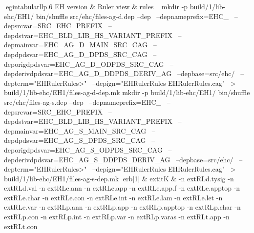 egin{tabular}{llp{.6\linewidth}}
EH version & Ruler view & rules \ \hline
mkdir -p build/1/lib-ehc/EH1/
bin/shuffle src/ehc/files-ag-d.dep --dep \
	  --depnameprefix=EHC_ \
	  --depsrcvar=SRC_EHC_PREFIX \
	  --depdstvar=EHC_BLD_LIB_HS_VARIANT_PREFIX \
	  --depmainvar=EHC_AG_D_MAIN_SRC_CAG \
	  --depdpdsvar=EHC_AG_D_DPDS_SRC_CAG \
	  --deporigdpdsvar=EHC_AG_D_ODPDS_SRC_CAG \
	  --depderivdpdsvar=EHC_AG_D_DDPDS_DERIV_AG \
	  --depbase=src/ehc/ \
	  --depterm="EHRulerRules>" \
	  --depign="EHRulerRules EHRulerRules.cag" \
	    > build/1/lib-ehc/EH1/files-ag-d-dep.mk
mkdir -p build/1/lib-ehc/EH1/
bin/shuffle src/ehc/files-ag-s.dep --dep \
	  --depnameprefix=EHC_ \
	  --depsrcvar=SRC_EHC_PREFIX \
	  --depdstvar=EHC_BLD_LIB_HS_VARIANT_PREFIX \
	  --depmainvar=EHC_AG_S_MAIN_SRC_CAG \
	  --depdpdsvar=EHC_AG_S_DPDS_SRC_CAG \
	  --deporigdpdsvar=EHC_AG_S_ODPDS_SRC_CAG \
	  --depderivdpdsvar=EHC_AG_S_DDPDS_DERIV_AG \
	  --depbase=src/ehc/ \
	  --depterm="EHRulerRules>" \
	  --depign="EHRulerRules EHRulerRules.cag" \
	    > build/1/lib-ehc/EH1/files-ag-s-dep.mk
erb|1| & 	extit{K} & 
-n 	extRL{d.tysig}\hspace{.5em} 
-n 	extRL{d.val}\hspace{.5em} 
-n 	extRL{e.ann}\hspace{.5em} 
-n 	extRL{e.app}\hspace{.5em} 
-n 	extRL{e.app.f}\hspace{.5em} 
-n 	extRL{e.apptop}\hspace{.5em} 
-n 	extRL{e.char}\hspace{.5em} 
-n 	extRL{e.con}\hspace{.5em} 
-n 	extRL{e.int}\hspace{.5em} 
-n 	extRL{e.lam}\hspace{.5em} 
-n 	extRL{e.let}\hspace{.5em} 
-n 	extRL{e.var}\hspace{.5em} 
-n 	extRL{p.ann}\hspace{.5em} 
-n 	extRL{p.app}\hspace{.5em} 
-n 	extRL{p.apptop}\hspace{.5em} 
-n 	extRL{p.char}\hspace{.5em} 
-n 	extRL{p.con}\hspace{.5em} 
-n 	extRL{p.int}\hspace{.5em} 
-n 	extRL{p.var}\hspace{.5em} 
-n 	extRL{p.varas}\hspace{.5em} 
-n 	extRL{t.app}\hspace{.5em} 
-n 	extRL{t.con}\hspace{.5em} 
